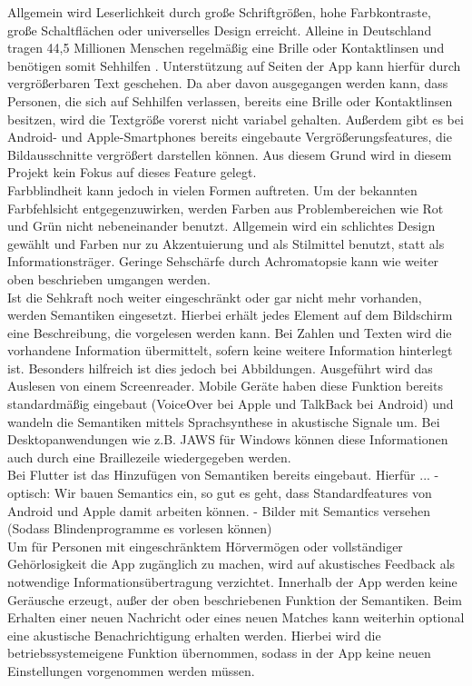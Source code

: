 Allgemein wird Leserlichkeit durch große Schriftgrößen, hohe Farbkontraste, große Schaltflächen oder universelles Design erreicht. Alleine in Deutschland tragen 44,5 Millionen Menschen regelmäßig eine Brille oder Kontaktlinsen und benötigen somit Sehhilfen \cite{sehhilfen}. Unterstützung auf Seiten der App kann hierfür durch vergrößerbaren Text geschehen. Da aber davon ausgegangen werden kann, dass Personen, die sich auf Sehhilfen verlassen, bereits eine Brille oder Kontaktlinsen besitzen, wird die Textgröße vorerst nicht variabel gehalten. Außerdem gibt es bei Android- und Apple-Smartphones bereits eingebaute Vergrößerungsfeatures, die Bildausschnitte vergrößert darstellen können. Aus diesem Grund wird in diesem Projekt kein Fokus auf dieses Feature gelegt. \\
Farbblindheit kann jedoch in vielen Formen auftreten. Um der bekannten Farbfehlsicht entgegenzuwirken, werden Farben aus Problembereichen wie Rot und Grün nicht nebeneinander benutzt. Allgemein wird ein schlichtes Design gewählt und Farben nur zu Akzentuierung und als Stilmittel benutzt, statt als Informationsträger. %
 Geringe Sehschärfe durch Achromatopsie kann wie weiter oben beschrieben umgangen werden.\\

Ist die Sehkraft noch weiter eingeschränkt oder gar nicht mehr vorhanden, werden Semantiken eingesetzt. Hierbei erhält jedes Element auf dem Bildschirm eine Beschreibung, die vorgelesen werden kann. Bei Zahlen und Texten wird die vorhandene Information übermittelt, sofern keine weitere Information hinterlegt ist. Besonders hilfreich ist dies jedoch bei Abbildungen. Ausgeführt wird das Auslesen von einem Screenreader. Mobile Geräte haben diese Funktion bereits standardmäßig eingebaut (VoiceOver bei Apple und TalkBack bei Android) und wandeln die Semantiken mittels Sprachsynthese in akustische Signale um. Bei Desktopanwendungen wie z.B. JAWS für Windows können diese Informationen auch durch eine Braillezeile wiedergegeben werden.\\
Bei Flutter ist das Hinzufügen von Semantiken bereits eingebaut. Hierfür ...
- optisch: Wir bauen Semantics ein, so gut es geht, dass Standardfeatures von Android und Apple damit arbeiten können. %
- Bilder mit Semantics versehen (Sodass Blindenprogramme es vorlesen können)\\


Um für Personen mit eingeschränktem Hörvermögen oder vollständiger Gehörlosigkeit die App zugänglich zu machen, wird auf akustisches Feedback als notwendige Informationsübertragung verzichtet. Innerhalb der App werden keine Geräusche erzeugt, außer der oben beschriebenen Funktion der Semantiken. Beim Erhalten einer neuen Nachricht oder eines neuen Matches kann weiterhin optional eine akustische Benachrichtigung erhalten werden. Hierbei wird die betriebssystemeigene Funktion übernommen, sodass in der App keine neuen Einstellungen vorgenommen werden müssen.\\

